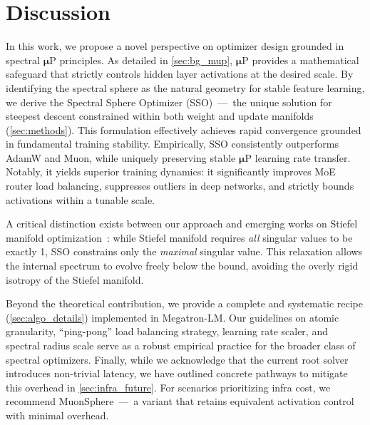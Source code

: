 \section{Discussion}
\label{sec:discussion}

In this work, we propose a novel perspective on optimizer design grounded in spectral
$\boldsymbol{\mu}$P principles. As detailed in \cref{sec:bg_mup}, $\boldsymbol{\mu}$P provides a mathematical safeguard that strictly controls hidden layer activations at the desired scale. By identifying the spectral sphere as the natural geometry for stable feature learning,  we derive the Spectral Sphere Optimizer (SSO)~---~the unique solution for steepest descent constrained within both weight and update manifolds (\cref{sec:methods}). This formulation effectively achieves rapid convergence grounded in fundamental training stability. Empirically, SSO consistently outperforms AdamW and Muon, while uniquely preserving stable $\boldsymbol{\mu}$P learning rate transfer. Notably, it yields superior training dynamics: it significantly improves MoE router load balancing, suppresses outliers in deep networks, and strictly bounds activations within a tunable scale.


A critical distinction exists between our approach and emerging works on Stiefel manifold optimization~\citep{bernstein2025manifolds}: while Stiefel manifold requires \emph{all} singular values to be exactly 1, SSO constrains only the \emph{maximal} singular value. This relaxation allows the internal spectrum to evolve freely below the bound, avoiding the overly rigid isotropy of the Stiefel manifold.

Beyond the theoretical contribution, we provide a complete and systematic recipe (\cref{sec:algo_details}) implemented in Megatron-LM. Our guidelines on atomic granularity, ``ping-pong'' load balancing strategy, learning rate scaler, and spectral radius scale serve as a robust empirical practice for the broader class of spectral optimizers. Finally, while we acknowledge that the current root solver introduces non-trivial latency, we have outlined concrete pathways to mitigate this overhead in \cref{sec:infra_future}. For scenarios prioritizing infra cost, we recommend MuonSphere~---~a variant that retains equivalent activation control with minimal overhead.
